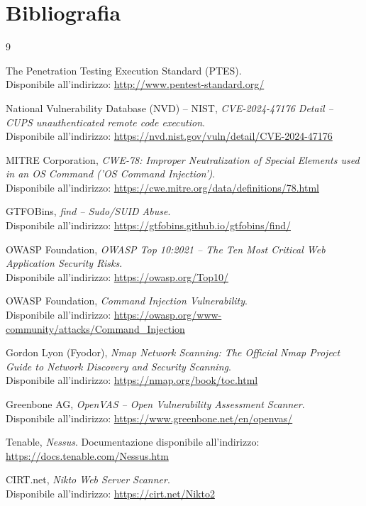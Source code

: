 \documentclass[11pt]{report}
\begin{document}
	\newpage
	

	\chapter{Bibliografia}
	{
		\renewcommand{\chapter}[2]{}
		\begin{thebibliography}{9}
			
			The Penetration Testing Execution Standard (PTES).\\
			Disponibile all'indirizzo: \url{http://www.pentest-standard.org/}
			
			National Vulnerability Database (NVD) -- NIST, \textit{CVE-2024-47176 Detail -- CUPS unauthenticated remote code execution}.\\
			Disponibile all'indirizzo: \url{https://nvd.nist.gov/vuln/detail/CVE-2024-47176}
			
			MITRE Corporation, \textit{CWE-78: Improper Neutralization of Special Elements used in an OS Command ('OS Command Injection')}.\\
			Disponibile all'indirizzo: \url{https://cwe.mitre.org/data/definitions/78.html}
			
			GTFOBins, \textit{find -- Sudo/SUID Abuse}.\\
			Disponibile all'indirizzo: \url{https://gtfobins.github.io/gtfobins/find/}
			
			OWASP Foundation, \textit{OWASP Top 10:2021 -- The Ten Most Critical Web Application Security Risks}.\\
			Disponibile all'indirizzo: \url{https://owasp.org/Top10/}
			
			OWASP Foundation, \textit{Command Injection Vulnerability}.\\
			Disponibile all'indirizzo: \url{https://owasp.org/www-community/attacks/Command_Injection}
			
			Gordon Lyon (Fyodor), \textit{Nmap Network Scanning: The Official Nmap Project Guide to Network Discovery and Security Scanning}.\\
			Disponibile all'indirizzo: \url{https://nmap.org/book/toc.html}
			
			Greenbone AG, \textit{OpenVAS -- Open Vulnerability Assessment Scanner}.\\
			Disponibile all'indirizzo: \url{https://www.greenbone.net/en/openvas/}
			
			Tenable, \textit{Nessus}. Documentazione disponibile all'indirizzo: \url{https://docs.tenable.com/Nessus.htm}
			
			CIRT.net, \textit{Nikto Web Server Scanner}.\\
			Disponibile all'indirizzo: \url{https://cirt.net/Nikto2}
		\end{thebibliography}
	}
\end{document}
